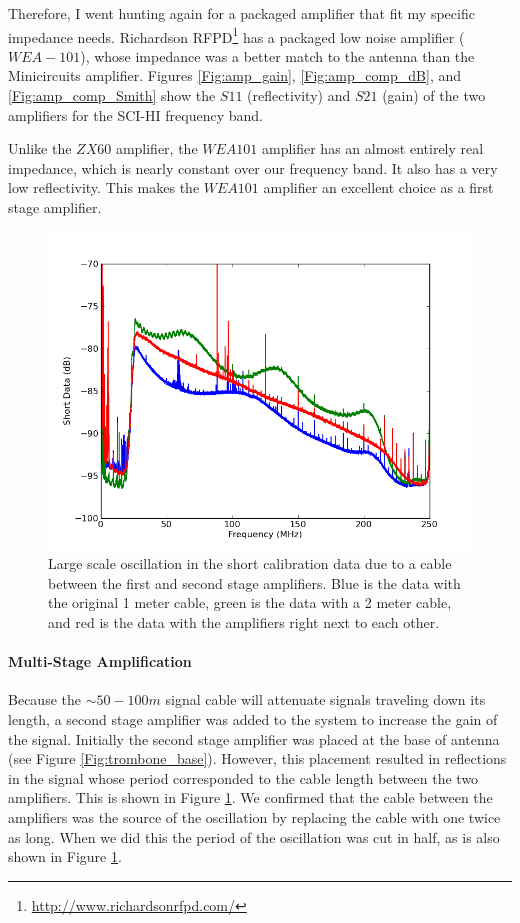 Therefore, I went hunting again for a packaged amplifier that fit my specific impedance needs. Richardson RFPD\footnote{\url{http://www.richardsonrfpd.com/}} has a packaged low noise amplifier ($WEA-101$), whose impedance was a better match to the antenna than the Minicircuits amplifier. Figures \ref{Fig:amp_gain}, \ref{Fig:amp_comp_dB}, and \ref{Fig:amp_comp_Smith} show the $S11$ (reflectivity) and $S21$ (gain) of the two amplifiers for the SCI-HI frequency band. 

Unlike the $ZX60$ amplifier, the $WEA101$ amplifier has an almost entirely real impedance, which is nearly constant over our frequency band. It also has a very low reflectivity. This makes the $WEA101$ amplifier an excellent choice as a first stage amplifier. 

\begin{figure}[htb]
\begin{center}
\includegraphics[width=0.9\linewidth]{SCIHI_system/figures/antenna_rf_cable_reflections.png}
\caption{Large scale oscillation in the short calibration data due to a cable between the first and second stage amplifiers. Blue is the data with the original 1 meter cable, green is the data with a 2 meter cable, and red is the data with the amplifiers right next to each other.}
\label{Fig:amp_reflect}
\end{center}
\end{figure}

\paragraph{Multi-Stage Amplification}

Because the $\sim 50-100 m$ signal cable will attenuate signals traveling down its length, a second stage amplifier was added to the system to increase the gain of the signal. Initially the second stage amplifier was placed at the base of antenna (see Figure \ref{Fig:trombone_base}). However, this placement resulted in reflections in the signal whose period corresponded to the cable length between the two amplifiers. This is shown in Figure \ref{Fig:amp_reflect}. We confirmed that the cable between the amplifiers was the source of the oscillation by replacing the cable with one twice as long. When we did this the period of the oscillation was cut in half, as is also shown in Figure \ref{Fig:amp_reflect}. 

